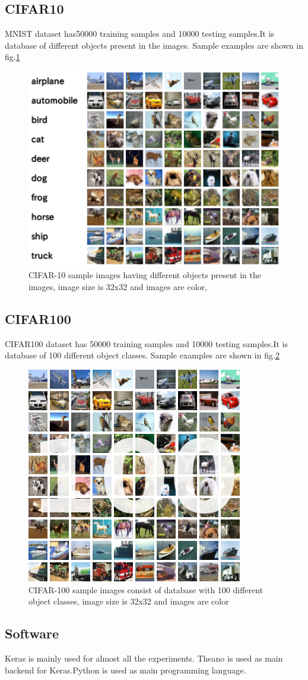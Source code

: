 \subsection{CIFAR10}
MNIST dataset has50000 training samples and 10000 testing samples.It is database of different objects present in the images. Sample examples are shown in fig.\ref{fig:cifar10_example}

\begin{figure}[H]
	\centering
	\includegraphics[scale=0.8]{Images/cifar10}
	\caption{\label{fig:cifar10_example} CIFAR-10 sample images having different objects present in the images, image size is 32x32 and images are color,} 
\end{figure}

\subsection{CIFAR100}
CIFAR100 dataset has 50000 training samples and 10000 testing samples.It is database of 100 different object classes. Sample examples are shown in fig.\ref{fig:cif00_example}

\begin{figure}[H]
	\centering
	\includegraphics[scale=0.8]{Images/cifar_100}
	\caption{\label{fig:cif00_example} CIFAR-100 sample images consist of database with 100 different object classes, image size is 32x32 and images are color} 
\end{figure}

\subsection{Software}
Keras \cite{chollet2015} is mainly used for almost all the experiments. Theano \cite{2016arXiv160502688short} is used as main backend for Keras.Python is used as main programming language.